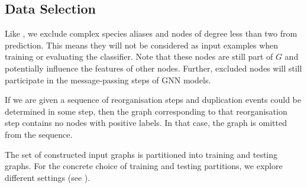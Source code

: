 \documentclass[
	fontsize=10pt, %
	twoside=false, %
	secnumdepth=1, %
  toc=indentunnumbered %
]{kaobook}
\begin{document}
\subsection{Data Selection}


Like \nielsen{}, we exclude complex species aliases and nodes of degree less than
two from prediction. This means they will not be considered as input examples
when training or evaluating the classifier. Note that these nodes are still part
of $G$ and potentially influence the features of other nodes. Further, excluded
nodes will still participate in the message-passing steps of GNN models.

If we are given a sequence of reorganisation steps and duplication events could
be determined in some step, then the graph corresponding to that reorganisation
step contains no nodes with positive labels. In that case, the graph is omitted
from the sequence. 

The set of constructed input graphs is partitioned into training and
testing graphs. For the concrete choice of training and testing partitions, we
explore different settings (see ).
\end{document}
